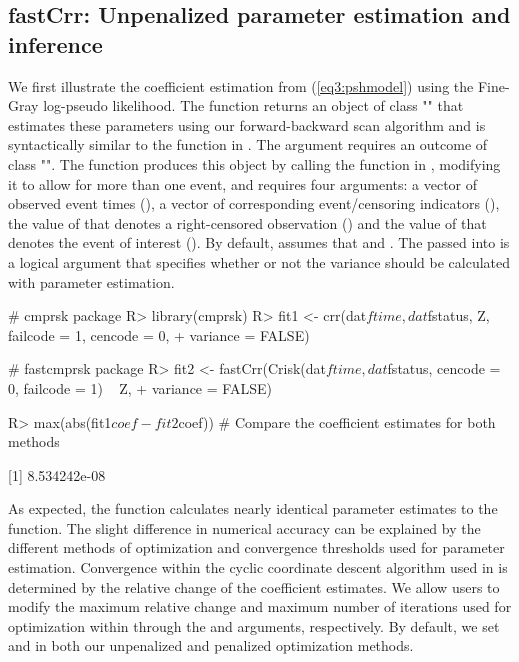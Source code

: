 \subsection{fastCrr: Unpenalized parameter estimation and inference}
We first illustrate the coefficient estimation from (\ref{eq3:pshmodel}) using the Fine-Gray log-pseudo likelihood. 
The  function returns an object of class "" that estimates these parameters using our forward-backward scan algorithm and is syntactically similar to the  function in . The  argument requires an outcome of class "". The  function produces this object by calling the  function in , modifying it to allow for more than one event, and requires four arguments: a vector of observed event times (), a vector of corresponding event/censoring indicators (), the value of  that denotes a right-censored observation () and the value of  that denotes the event of interest (). By default,  assumes that  and . The  passed into  is a logical argument that specifies whether or not the variance should be calculated with parameter estimation.
\begin{example}
# cmprsk package
R> library(cmprsk)
R> fit1 <- crr(dat$ftime, dat$fstatus, Z, failcode = 1, cencode = 0,
+                      variance = FALSE)

# fastcmprsk package
R> fit2 <- fastCrr(Crisk(dat$ftime, dat$fstatus, cencode = 0, failcode = 1) ~ Z,
+                           variance = FALSE)

R> max(abs(fit1$coef - fit2$coef)) # Compare the coefficient estimates for both methods

[1] 8.534242e-08
\end{example}
As expected, the  function calculates nearly identical parameter estimates to the  function. The slight difference in numerical accuracy can be explained by the different methods of optimization and convergence thresholds used for parameter estimation. Convergence within the cyclic coordinate descent algorithm used in  is determined by the relative change of the coefficient estimates. We allow users to modify the maximum relative change and maximum number of iterations used for optimization within  through the  and  arguments, respectively. By default, we set  and  in both our unpenalized and penalized optimization methods.


